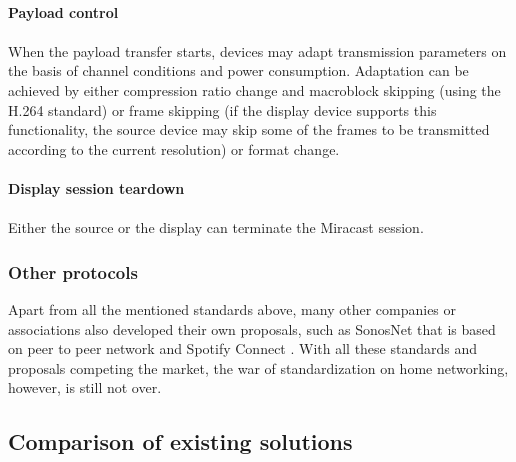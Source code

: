 \\
\textbf{Payload control}\\
\\
When the payload transfer starts, devices may adapt transmission parameters on the basis of channel conditions and power     consumption. Adaptation can be achieved by either compression ratio change and macroblock skipping (using the H.264 standard) or frame skipping (if the display device supports this functionality, the source device may skip some of the frames to be transmitted according to the current resolution) or format change. \\
\\ 
\textbf{Display session teardown} \\
\\
Either the source or the display can terminate the Miracast session.
\subsubsection{Other protocols}
Apart from all the mentioned standards above, many other companies or associations 
also developed their own proposals, such as SonosNet \cite{sonosnet} that is 
based on peer to peer network and Spotify Connect \cite{spotifyconnect}. With all these standards and proposals competing the market, the war of standardization on home networking, however, is still not over. 

\subsection{Comparison of existing solutions} 
